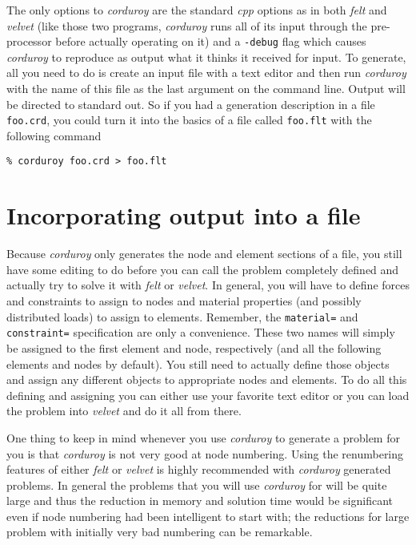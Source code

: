 The only options to {\em corduroy} are the standard {\em cpp} options
as in both {\em felt} and {\em velvet} (like those two programs, 
{\em corduroy} runs all of its input through the pre-processor before
actually operating on it) and a {\tt -debug} flag which causes
{\em corduroy} to reproduce as output what it thinks it received for
input.  To generate, all you need to do is create
an input file with a text editor and then run {\em corduroy} with the
name of this file as the last argument on the command line.  Output
will be directed to standard out.  So if you had a generation description
in a file {\tt foo.crd}, you could turn it into the basics of a \felt{}
file called {\tt foo.flt} with the following command
\begin{screen}
 \begin{verbatim}
% corduroy foo.crd > foo.flt
 \end{verbatim}
\end{screen}

\section{Incorporating output into a \felt{} file}
\label{corduroy.incorporating}

Because {\em corduroy} only generates the node and element sections of
a \felt{} file, you still have some editing to do before you can call the
problem completely defined and actually try to solve it with {\em felt}
or {\em velvet}. In general, you will have to define forces and constraints
to assign to nodes and material properties (and possibly distributed
loads) to assign to elements.  Remember, the {\tt material=} and 
{\tt constraint=} specification are only a convenience.  These two names
will simply be assigned to the first element and node, respectively (and
all the following elements and nodes by default).  You still need to 
actually define those objects and assign any different objects to
appropriate nodes and elements.  To do all this defining and assigning you 
can either use your favorite text editor or you can load 
the problem into {\em velvet} and do it all from there.  

One thing to keep in mind whenever you use {\em corduroy} to generate
a problem for you is that {\em corduroy} is not very good at node numbering.
Using the renumbering
features of either {\em felt} or {\em velvet} is highly recommended with
{\em corduroy} generated problems.  In general the problems that you will
use {\em corduroy} for will be quite large and thus the reduction in memory
and solution time would be significant even if node numbering had been
intelligent to start with; the reductions for large problem with initially
very bad numbering can be remarkable.
